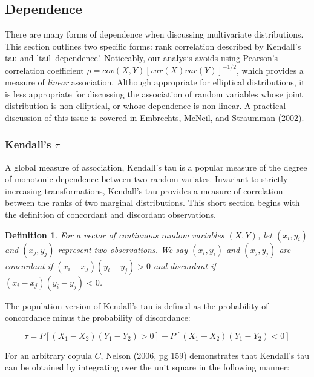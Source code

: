 \documentclass[12pt]{article}
\newtheorem{defn}{Definition}
\begin{document}
\subsection{Dependence}

There are many forms of dependence when discussing multivariate distributions. This section outlines two specific forms: rank correlation described by Kendall's tau and 'tail--dependence'. Noticeably, our analysis avoids using Pearson's correlation coefficient $\rho = cov\left(X,Y\right)\left[var\left(X\right)var\left(Y\right)\right]^{-1/2}$, which provides a measure of \textit{linear} association. Although appropriate for elliptical distributions, it is less appropriate for discussing the association of random variables whose joint distribution is non-elliptical, or whose dependence is non-linear. A practical discussion of this issue is covered in Embrechts, McNeil, and Straumman (2002).

\subsubsection{Kendall's $\tau$}

A global measure of association, Kendall's tau is a popular measure of the degree of monotonic dependence between two random variates. Invariant to strictly increasing transformations, Kendall's tau provides a measure of correlation between the ranks of two marginal distributions. This short section begins with the definition of concordant and discordant observations.

\begin{defn}
For a vector of continuous random variables $\left(X,Y\right)$, let $\left(x_{i},y_{i}\right)$ and $\left(x_{j},y_{j}\right)$ represent two observations. We say $\left(x_{i},y_{i}\right)$ and $\left(x_{j},y_{j}\right)$ are concordant if $\left(x_{i} - x_{j}\right)\left(y_{i}-y_{j}\right) > 0$ and discordant if $\left(x_{i}-x_{j}\right)\left(y_{i} - y_{j}\right) < 0$.
\end{defn}

The population version of Kendall's tau is defined as the probability of concordance minus the probability of discordance:

\begin{equation}
\tau = P\left[\left(X_{1} - X_{2}\right)\left(Y_{1} - Y_{2}\right) > 0\right] - P\left[\left(X_{1} - X_{2}\right)\left(Y_{1} - Y_{2}\right) < 0\right]
\end{equation}

For an arbitrary copula $C$, Nelson (2006, pg 159) demonstrates that Kendall's tau can be obtained by integrating over the unit square in the following manner:
\end{document}
